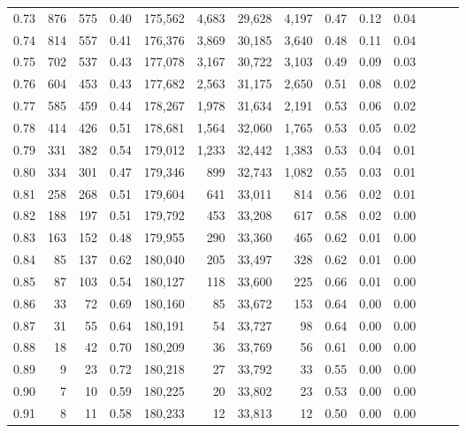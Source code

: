 \begin{tabular}{rrrrrrrrrrrrrr}
0.73 &    876 &    575 &  0.40 &  175,562 &    4,683 &  29,628 &   4,197 &  0.47 &  0.12 &      0.04 \\
0.74 &    814 &    557 &  0.41 &  176,376 &    3,869 &  30,185 &   3,640 &  0.48 &  0.11 &      0.04 \\
0.75 &    702 &    537 &  0.43 &  177,078 &    3,167 &  30,722 &   3,103 &  0.49 &  0.09 &      0.03 \\
0.76 &    604 &    453 &  0.43 &  177,682 &    2,563 &  31,175 &   2,650 &  0.51 &  0.08 &      0.02 \\
0.77 &    585 &    459 &  0.44 &  178,267 &    1,978 &  31,634 &   2,191 &  0.53 &  0.06 &      0.02 \\
0.78 &    414 &    426 &  0.51 &  178,681 &    1,564 &  32,060 &   1,765 &  0.53 &  0.05 &      0.02 \\
0.79 &    331 &    382 &  0.54 &  179,012 &    1,233 &  32,442 &   1,383 &  0.53 &  0.04 &      0.01 \\
0.80 &    334 &    301 &  0.47 &  179,346 &      899 &  32,743 &   1,082 &  0.55 &  0.03 &      0.01 \\
0.81 &    258 &    268 &  0.51 &  179,604 &      641 &  33,011 &     814 &  0.56 &  0.02 &      0.01 \\
0.82 &    188 &    197 &  0.51 &  179,792 &      453 &  33,208 &     617 &  0.58 &  0.02 &      0.00 \\
0.83 &    163 &    152 &  0.48 &  179,955 &      290 &  33,360 &     465 &  0.62 &  0.01 &      0.00 \\
0.84 &     85 &    137 &  0.62 &  180,040 &      205 &  33,497 &     328 &  0.62 &  0.01 &      0.00 \\
0.85 &     87 &    103 &  0.54 &  180,127 &      118 &  33,600 &     225 &  0.66 &  0.01 &      0.00 \\
0.86 &     33 &     72 &  0.69 &  180,160 &       85 &  33,672 &     153 &  0.64 &  0.00 &      0.00 \\
0.87 &     31 &     55 &  0.64 &  180,191 &       54 &  33,727 &      98 &  0.64 &  0.00 &      0.00 \\
0.88 &     18 &     42 &  0.70 &  180,209 &       36 &  33,769 &      56 &  0.61 &  0.00 &      0.00 \\
0.89 &      9 &     23 &  0.72 &  180,218 &       27 &  33,792 &      33 &  0.55 &  0.00 &      0.00 \\
0.90 &      7 &     10 &  0.59 &  180,225 &       20 &  33,802 &      23 &  0.53 &  0.00 &      0.00 \\
0.91 &      8 &     11 &  0.58 &  180,233 &       12 &  33,813 &      12 &  0.50 &  0.00 &      0.00 \\

\end{tabular}
